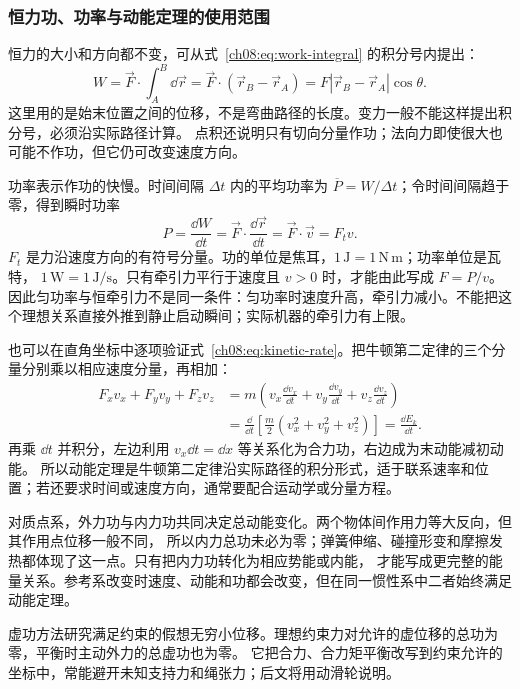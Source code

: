 \subsubsection*{恒力功、功率与动能定理的使用范围}

恒力的大小和方向都不变，可从式~\eqref{ch08:eq:work-integral} 的积分号内提出：
\[
 W=\vec F\cdot\int_A^B\dd\vec r
  =\vec F\cdot(\vec r_B-\vec r_A)=F|\vec r_B-\vec r_A|\cos\theta.
\]
这里用的是始末位置之间的位移，不是弯曲路径的长度。变力一般不能这样提出积分号，必须沿实际路径计算。
点积还说明只有切向分量作功；法向力即使很大也可能不作功，但它仍可改变速度方向。

功率表示作功的快慢。时间间隔 $\Delta t$ 内的平均功率为 $\overline P=W/\Delta t$；令时间间隔趋于零，得到瞬时功率
\begin{equation}
 P=\frac{\dd W}{\dd t}
 =\vec F\cdot\frac{\dd\vec r}{\dd t}
 =\vec F\cdot\vec v=F_t v.
 \label{ch08:eq:power}
\end{equation}
$F_t$ 是力沿速度方向的有符号分量。功的单位是焦耳，$1\,\mathrm J=1\,\mathrm{N\,m}$；功率单位是瓦特，
$1\,\mathrm W=1\,\mathrm{J/s}$。只有牵引力平行于速度且 $v>0$ 时，才能由此写成 $F=P/v$。
因此匀功率与恒牵引力不是同一条件：匀功率时速度升高，牵引力减小。不能把这个理想关系直接外推到静止启动瞬间；实际机器的牵引力有上限。

也可以在直角坐标中逐项验证式~\eqref{ch08:eq:kinetic-rate}。把牛顿第二定律的三个分量分别乘以相应速度分量，再相加：
\begin{align*}
 F_xv_x+F_yv_y+F_zv_z
 &=m\left(v_x\frac{\dd v_x}{\dd t}+v_y\frac{\dd v_y}{\dd t}+v_z\frac{\dd v_z}{\dd t}\right)\\
 &=\frac{\dd}{\dd t}\left[\frac m2(v_x^2+v_y^2+v_z^2)\right]
 =\frac{\dd E_k}{\dd t}.
\end{align*}
再乘 $\dd t$ 并积分，左边利用 $v_x\dd t=\dd x$ 等关系化为合力功，右边成为末动能减初动能。
所以动能定理是牛顿第二定律沿实际路径的积分形式，适于联系速率和位置；若还要求时间或速度方向，通常要配合运动学或分量方程。

对质点系，外力功与内力功共同决定总动能变化。两个物体间作用力等大反向，但其作用点位移一般不同，
所以内力总功未必为零；弹簧伸缩、碰撞形变和摩擦发热都体现了这一点。只有把内力功转化为相应势能或内能，
才能写成更完整的能量关系。参考系改变时速度、动能和功都会改变，但在同一惯性系中二者始终满足动能定理。

虚功方法研究满足约束的假想无穷小位移。理想约束力对允许的虚位移的总功为零，平衡时主动外力的总虚功也为零。
它把合力、合力矩平衡改写到约束允许的坐标中，常能避开未知支持力和绳张力；后文将用动滑轮说明。
